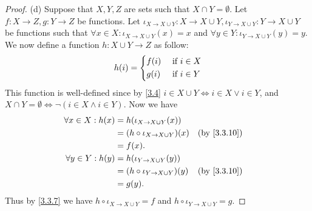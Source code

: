 \begin{proof}{(d)}
  Suppose that \(X, Y, Z\) are sets such that \(X \cap Y = \emptyset\).
  Let \(f : X \to Z, g : Y \to Z\) be functions.
  Let \(\iota_{X \to X \cup Y} : X \to X \cup Y, \iota_{Y \to X \cup Y} : Y \to X \cup Y\) be functions such that \(\forall x \in X : \iota_{X \to X \cup Y}(x) = x\) and \(\forall y \in Y : \iota_{Y \to X \cup Y}(y) = y\).
  We now define a function \(h : X \cup Y \to Z\) as follow:
  \[
    h(i) = \begin{dcases}
      f(i) & \text{ if } i \in X \\
      g(i) & \text{ if } i \in Y
    \end{dcases}
  \]
  This function is well-defined since by \cref{3.4} \(i \in X \cup Y \iff i \in X \lor i \in Y\), and \(X \cap Y = \emptyset \iff \lnot(i \in X \land i \in Y)\).
  Now we have
  \begin{align*}
    \forall x \in X : h(x) & = h(\iota_{X \to X \cup Y}(x))                         \\
                           & = (h \circ \iota_{X \to X \cup Y})(x) &  & \by{3.3.10} \\
                           & = f(x).                                                \\
    \forall y \in Y : h(y) & = h(\iota_{Y \to X \cup Y}(y))                         \\
                           & = (h \circ \iota_{Y \to X \cup Y})(y) &  & \by{3.3.10} \\
                           & = g(y).
  \end{align*}
  Thus by \cref{3.3.7} we have \(h \circ \iota_{X \to X \cup Y} = f\) and \(h \circ \iota_{Y \to X \cup Y} = g\).


\end{proof}
